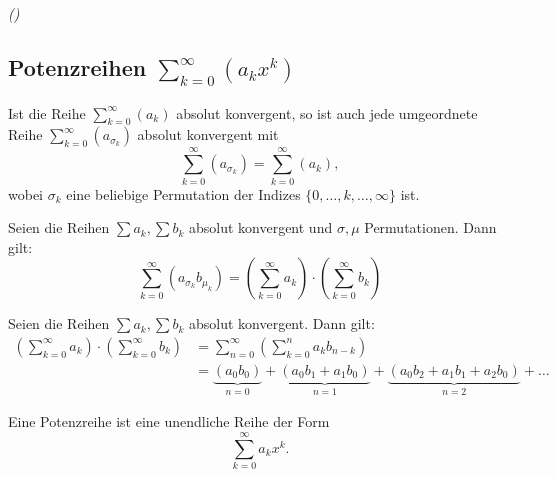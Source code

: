 
\emph{()}

\subsection{Potenzreihen $ \sum_{k=0}^\infty \left( a_k x^k \right) $}
\label{sec:potenzreihen}

\begin{theorem}
   Ist die Reihe $ \sum_{k=0}^\infty \left( a_k \right) $ absolut konvergent, so ist auch jede umgeordnete Reihe $ \sum_{k=0}^\infty \left( a_{\sigma_k} \right) $ absolut konvergent mit 
   \begin{equation*}
    \sum_{k=0}^\infty \left( a_{\sigma_k} \right) = \sum_{k=0}^\infty \left( a_k \right),
   \end{equation*}
   wobei $\sigma_k$ eine beliebige Permutation der Indizes $\{0,\ldots, k,\ldots, \infty\}$ ist.
\end{theorem}
\begin{theorem}
   Seien die Reihen $\sum a_k, \sum b_k$ absolut konvergent und $\sigma, \mu $ Permutationen. Dann gilt:
   \begin{equation*}
      \sum_{k=0}^\infty \left( a_{\sigma_k} b_{\mu_k} \right) = \left(\sum_{k=0}^{\infty} a_k \right)\cdot \left(\sum_{k=0}^{\infty} b_k \right)
   \end{equation*}
\end{theorem}
\begin{theorem}
   Seien die Reihen $\sum a_k, \sum b_k $ absolut konvergent. Dann gilt:
   \begin{align*}
      \left(\sum_{k=0}^\infty  a_k \right)\cdot\left(\sum_{k=0}^\infty  b_k\right) &= \sum_{n=0}^\infty \left(\sum_{k=0}^n  a_k b_{n-k} \right) \\
      &= \underbrace{(a_0 b_0)}_{n=0} + \underbrace{(a_0 b_1 + a_1 b_0)}_{n=1} + \underbrace{(a_0 b_2 + a_1 b_1 + a_2 b_0)}_{n=2} + \ldots
   \end{align*}
\end{theorem}

\begin{definition}[Potenzreihe]
   Eine Potenzreihe ist eine unendliche Reihe der Form
   \begin{equation*}
   \sum_{k=0}^\infty a_k x^k.
   \end{equation*}
\end{definition} 

